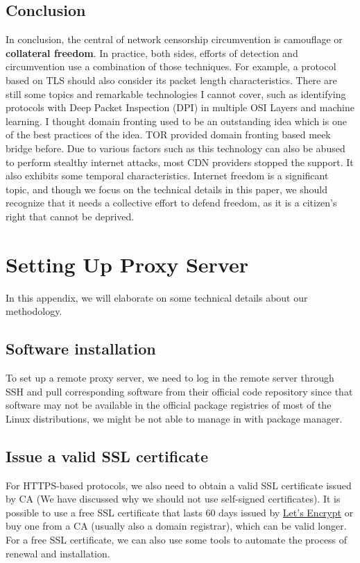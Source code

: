 \documentclass[conference]{IEEEtran}
\begin{document}
\subsection{Conclusion}
In conclusion, the central of network censorship circumvention is camouflage or \textbf{collateral freedom}. In practice, both sides, efforts of detection and circumvention use a combination of those techniques. For example, a protocol based on TLS should also consider its packet length characteristics. There are still some topics and remarkable technologies I cannot cover, such as identifying protocols with Deep Packet Inspection (DPI) in multiple OSI Layers and machine learning. I thought domain fronting used to be an outstanding idea which is one of the best practices of the idea. 
TOR provided domain fronting \cite{domainfronting} based meek bridge \cite{meek} before. Due to various factors such as this technology can also be abused to perform stealthy internet attacks, most CDN providers stopped the support. It also exhibits some temporal characteristics. Internet freedom is a significant topic, and though we focus on the technical details in this paper, we should recognize that it needs a collective effort to defend freedom, as it is a citizen's right that cannot be deprived.





\appendix
\section{Setting Up Proxy Server}
In this appendix, we will elaborate on some technical details about our methodology.

\subsection{Software installation}
To set up a remote proxy server, we need to log in the remote server through SSH and pull corresponding software from their official code repository since that software may not be available in the official package registries of most of the Linux distributions, we might be not able to manage in with package manager. 

\subsection{Issue a valid SSL certificate}
For HTTPS-based protocols, we also need to obtain a valid SSL certificate issued by CA (We have discussed why we should not use self-signed certificates). It is possible to use a free SSL certificate that lasts 60 days issued by \href{https://letsencrypt.org/}{Let's Encrypt} or buy one from a CA (usually also a domain registrar), which can be valid longer. For a free SSL certificate, we can also use some tools to automate the process of renewal and installation.
\end{document}
